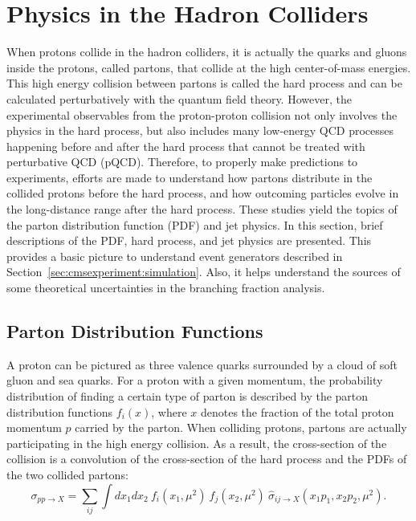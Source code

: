 

\section{Physics in the Hadron Colliders}
\label{sec:physics:ppCollision} 

When protons collide in the hadron colliders, it is actually the quarks and gluons inside the protons, called partons, that collide at the high center-of-mass energies. This high energy collision between partons is called the hard process and can be calculated perturbatively with the quantum field theory. However, the experimental observables from the proton-proton collision not only involves the physics in the hard process, but also includes many low-energy QCD processes happening before and after the hard process that cannot be treated with perturbative QCD (pQCD). Therefore, to properly make predictions to experiments, efforts are made to understand how partons distribute in the collided protons before the hard process, and how outcoming particles evolve in the long-distance range after the hard process. These studies yield the topics of the parton distribution function (PDF) and jet physics. In this section, brief descriptions of the PDF, hard process, and jet physics are presented. This provides a basic picture to understand event generators described in Section~\ref{sec:cmsexperiment:simulation}. Also, it helps understand the sources of some theoretical uncertainties in the \PW branching fraction analysis.

\subsection{Parton Distribution Functions}
\label{sec:physics:ppCollision:pdf} 


A proton can be pictured as three valence quarks surrounded by a cloud of soft gluon and sea quarks. For a proton with a given momentum, the probability distribution of finding a certain type of parton is described by the parton distribution functions $f_i(x)$, where $x$ denotes the fraction of the total proton momentum $p$ carried by the parton. When colliding protons, partons are actually participating in the high energy collision. As a result, the cross-section of the collision is a convolution of the cross-section of the hard process and the PDFs of the two collided partons:
\begin{equation}
    \sigma_{pp\to X } = \sum_{ij}\int dx_1 dx_2 ~ f_i(x_1, \mu^2) ~ f_j(x_2, \mu^2) ~ \hat{\sigma}_{ij\to X } (x_1 p_1, x_2 p_2,\mu^2) .
    \label{eqn:physics:qft:ppCollision:factorization}
\end{equation}

